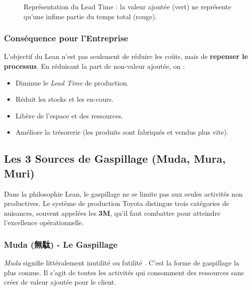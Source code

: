 \documentclass[a4paper,12pt]{article}
\begin{document}
\begin{figure}[h!]
\centering
{}
\caption{Représentation du Lead Time : la valeur ajoutée (vert) ne représente qu'une infime partie du temps total (rouge).}
\label{fig:ratio_efficacite}
\end{figure}

\subsubsection{Conséquence pour l'Entreprise}

L'objectif du Lean n'est pas seulement de réduire les coûts, mais de \textbf{repenser le processus}. En réduisant la part de non-valeur ajoutée, on :
\begin{itemize}
    \item Diminue le \textit{Lead Time} de production.
    \item Réduit les stocks et les en-cours.
    \item Libère de l'espace et des ressources.
    \item Améliore la trésorerie (les produits sont fabriqués et vendus plus vite).
\end{itemize}
\subsection{Les 3 Sources de Gaspillage (Muda, Mura, Muri)}

Dans la philosophie Lean, le gaspillage ne se limite pas aux seules activités non productives. Le système de production Toyota distingue trois catégories de nuisances, souvent appelées les \textbf{3M}, qu'il faut combattre pour atteindre l'excellence opérationnelle.

\subsubsection{Muda (無駄) - Le Gaspillage}

\textit{Muda} signifie littéralement \og inutilité \fg{} ou \og futilité \fg. C'est la forme de gaspillage la plus connue. Il s'agit de toutes les activités qui consomment des ressources sans créer de valeur ajoutée pour le client.
\end{document}
